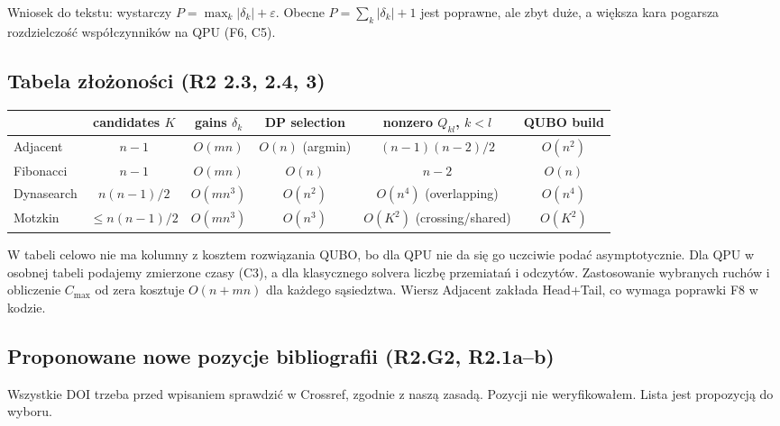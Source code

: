 \documentclass[11pt,a4paper]{article}
\newcommand{\Cmax}{C_{\max}}
\begin{document}
Wniosek do tekstu: wystarczy $P=\max_k|\delta_k|+\varepsilon$. Obecne $P=\sum_k|\delta_k|+1$ jest poprawne, ale zbyt duże, a większa kara pogarsza rozdzielczość współczynników na QPU (F6, C5).

\subsection{Tabela złożoności (R2 2.3, 2.4, 3)}\label{sec:zlozonosc}

\begin{center}\small
\begin{tabular}{@{}lccccc@{}}
\toprule
 & candidates $K$ & gains $\delta_k$ & DP selection & nonzero $Q_{kl}$, $k<l$ & QUBO build\\
\midrule
Adjacent  & $n-1$ & $O(mn)$ & $O(n)$ (argmin) & $(n-1)(n-2)/2$ & $O(n^2)$\\
Fibonacci & $n-1$ & $O(mn)$ & $O(n)$ & $n-2$ & $O(n)$\\
Dynasearch & $n(n-1)/2$ & $O(mn^3)$ & $O(n^2)$ & $O(n^4)$ (overlapping) & $O(n^4)$\\
Motzkin & $\le n(n-1)/2$ & $O(mn^3)$ & $O(n^3)$ & $O(K^2)$ (crossing/shared) & $O(K^2)$\\
\bottomrule
\end{tabular}
\end{center}
W tabeli celowo nie ma kolumny z kosztem rozwiązania QUBO, bo dla QPU nie da się go uczciwie podać asymptotycznie. Dla QPU w osobnej tabeli podajemy zmierzone czasy (C3), a dla klasycznego solvera liczbę przemiatań i odczytów. Zastosowanie wybranych ruchów i obliczenie $\Cmax$ od zera kosztuje $O(n+mn)$ dla każdego sąsiedztwa. Wiersz Adjacent zakłada Head+Tail, co wymaga poprawki F8 w kodzie.

\subsection{Proponowane nowe pozycje bibliografii (R2.G2, R2.1a--b)}\label{sec:lit}

Wszystkie DOI trzeba przed wpisaniem sprawdzić w Crossref, zgodnie z naszą zasadą. Pozycji nie weryfikowałem. Lista jest propozycją do wyboru.
\end{document}
